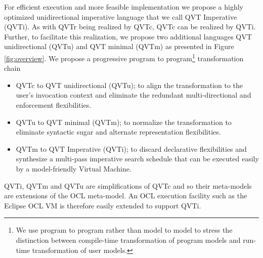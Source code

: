 For efficient execution and more feasible implementation we propose a highly optimized unidirectional imperative language that we call QVT Imperative (QVTi). As with QVTr being realized by QVTc, QVTc can be realized by QVTi. Further, to facilitate this realization, we propose two additional languages QVT unidirectional (QVTu) and QVT minimal (QVTm) as presented in Figure \ref{fig:overview}. We propose a progressive program to program\footnote{We use program to program rather than model to model to stress the distinction between compile-time transformation of program models and run-time transformation of user models.} transformation chain
\begin{itemize}
\item QVTc to QVT unidirectional (QVTu); to align the transformation to the user's invocation context and eliminate the redundant multi-directional and enforcement flexibilities.
\item QVTu to QVT minimal (QVTm); to normalize the transformation to eliminate syntactic sugar and alternate representation flexibilities.
\item QVTm to QVT Imperative (QVTi); to discard declarative flexibilities and synthesize a multi-pass imperative search schedule that can be executed easily by a model-friendly Virtual Machine.
\end{itemize}

QVTi, QVTm and QVTu are simplifications of QVTc and so their meta-models are extensions of the OCL meta-model. An OCL execution facility such as the Eclipse OCL VM\cite{Willink2012} is therefore easily extended to support QVTi.



